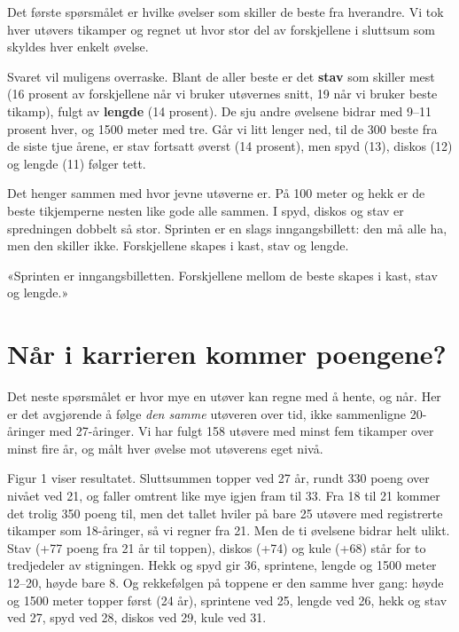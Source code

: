 Det første spørsmålet er hvilke øvelser som skiller de beste fra hverandre. Vi tok hver utøvers tikamper og regnet ut hvor stor del av forskjellene i sluttsum som skyldes hver enkelt øvelse.

Svaret vil muligens overraske. Blant de aller beste er det \textbf{stav} som skiller mest (16 prosent av forskjellene når vi bruker utøvernes snitt, 19 når vi bruker beste tikamp), fulgt av \textbf{lengde} (14 prosent). De sju andre øvelsene bidrar med 9--11 prosent hver, og 1500 meter med tre. Går vi litt lenger ned, til de 300 beste fra de siste tjue årene, er stav fortsatt øverst (14 prosent), men spyd (13), diskos (12) og lengde (11) følger tett.

Det henger sammen med hvor jevne utøverne er. På 100 meter og hekk er de beste tikjemperne nesten like gode alle sammen. I spyd, diskos og stav er spredningen dobbelt så stor. Sprinten er en slags inngangsbillett: den må alle ha, men den skiller ikke. Forskjellene skapes i kast, stav og lengde.

\begin{sitat}

«Sprinten er inngangsbilletten. Forskjellene mellom de beste skapes i kast, stav og lengde.»

\end{sitat}

\section{Når i karrieren kommer poengene?}\label{nuxe5r-i-karrieren-kommer-poengene}

Det neste spørsmålet er hvor mye en utøver kan regne med å hente, og når. Her er det avgjørende å følge \emph{den samme} utøveren over tid, ikke sammenligne 20-åringer med 27-åringer. Vi har fulgt 158 utøvere med minst fem tikamper over minst fire år, og målt hver øvelse mot utøverens eget nivå.

Figur 1 viser resultatet. Sluttsummen topper ved 27 år, rundt 330 poeng over nivået ved 21, og faller omtrent like mye igjen fram til 33. Fra 18 til 21 kommer det trolig 350 poeng til, men det tallet hviler på bare 25 utøvere med registrerte tikamper som 18-åringer, så vi regner fra 21. Men de ti øvelsene bidrar helt ulikt. Stav (+77 poeng fra 21 år til toppen), diskos (+74) og kule (+68) står for to tredjedeler av stigningen. Hekk og spyd gir 36, sprintene, lengde og 1500 meter 12--20, høyde bare 8. Og rekkefølgen på toppene er den samme hver gang: høyde og 1500 meter topper først (24 år), sprintene ved 25, lengde ved 26, hekk og stav ved 27, spyd ved 28, diskos ved 29, kule ved 31.

